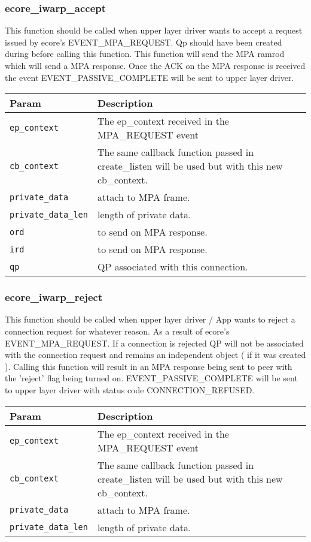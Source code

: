 \documentclass[11pt,fleqn,hidelinks,oneside]{book} %
\begin{document}
\subsubsection{ecore\_iwarp\_accept}
This function should be called when upper layer driver wants to accept a request issued by ecore's EVENT\_MPA\_REQUEST. Qp should have been created during before calling this function. This function will send the MPA ramrod which will send a MPA response. Once the ACK on the MPA response is received the event EVENT\_PASSIVE\_COMPLETE will be sent to upper layer driver.
\begin{center}
		\begin{tabular}{| l | p{10cm} |}
		\hline
		\textbf{Param} & \textbf{Description}\\ \hline
		\texttt{ep\_context} & The ep\_context received in the MPA\_REQUEST event\\ \hline
		\texttt{cb\_context} & The same callback function passed in create\_listen will be used but with this new cb\_context.\\ \hline
		\texttt{private\_data} & attach to MPA frame.\\ \hline
		\texttt{private\_data\_len} & length of private data.\\ \hline
		\texttt{ord} & to send on MPA response. \\ \hline
		\texttt{ird} & to send on MPA response. \\ \hline		
		\texttt{qp} & QP associated with this connection.\\ \hline		
		\end{tabular}
\end{center}

\subsubsection{ecore\_iwarp\_reject}
This function should be called when upper layer driver / App wants to reject a connection request for whatever reason. As a result of ecore's EVENT\_MPA\_REQUEST.
If a connection is rejected QP will not be associated with the connection request and remains an independent object ( if it was created ). Calling this function
will result in an MPA response being sent to peer with the 'reject' flag being turned on. EVENT\_PASSIVE\_COMPLETE will be sent to upper layer driver with status
code CONNECTION\_REFUSED.
\begin{center}
	\begin{tabular}{| l | p{10cm} |}
		\hline
		\textbf{Param} & \textbf{Description}\\ \hline
		\texttt{ep\_context} & The ep\_context received in the MPA\_REQUEST event\\ \hline
		\texttt{cb\_context} & The same callback function passed in create\_listen will be used but with this new cb\_context.\\ \hline
		\texttt{private\_data} & attach to MPA frame.\\ \hline
		\texttt{private\_data\_len} & length of private data.\\ \hline
	\end{tabular}
\end{center}
\end{document}

